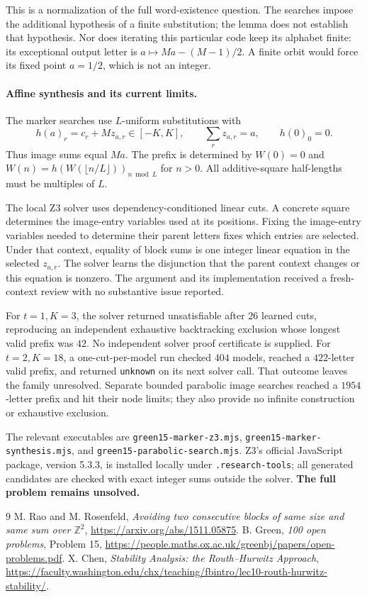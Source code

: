 \documentclass[11pt]{article}
\begin{document}
This is a normalization of the full word-existence question. The searches
impose the additional hypothesis of a finite substitution; the lemma does
not establish that hypothesis. Nor does iterating this particular code keep
its alphabet finite: its exceptional output letter is
$a\mapsto Ma-(M-1)/2$. A finite orbit would force its fixed point $a=1/2$,
which is not an integer.

\paragraph{Affine synthesis and its current limits.}
The marker searches use $L$-uniform substitutions with
\[
 h(a)_r=c_r+Mz_{a,r}\in[-K,K],\qquad
 \sum_r z_{a,r}=a,\qquad h(0)_0=0.
\]
Thus image sums equal $Ma$. The prefix is determined by
$W(0)=0$ and $W(n)=h(W(\lfloor n/L\rfloor))_{n\bmod L}$ for $n>0$.
All additive-square half-lengths must be multiples of $L$.

The local Z3 solver uses dependency-conditioned linear cuts. A concrete
square determines the image-entry variables used at its positions. Fixing
the image-entry variables needed to determine their parent letters fixes
which entries are selected. Under that context, equality of block sums is
one integer linear equation in the selected $z_{a,r}$. The solver learns
the disjunction that the parent context changes or this equation is nonzero.
The argument and its implementation received a fresh-context review with
no substantive issue reported.

For $t=1,K=3$, the solver returned unsatisfiable after $26$ learned cuts,
reproducing an independent exhaustive backtracking exclusion whose longest
valid prefix was $42$. No independent solver proof certificate is supplied.
For $t=2,K=18$, a one-cut-per-model run checked $404$ models, reached a
$422$-letter valid prefix, and returned \texttt{unknown} on its next solver
call. That outcome leaves the family unresolved. Separate bounded parabolic
image searches reached a $1954$-letter prefix and hit their node limits;
they also provide no infinite construction or exhaustive exclusion.

The relevant executables are \texttt{green15-marker-z3.mjs},
\texttt{green15-marker-synthesis.mjs}, and \texttt{green15-parabolic-search.mjs}.
Z3's official JavaScript package, version 5.3.3, is installed locally under
\texttt{.research-tools}; all generated candidates are checked with exact
integer sums outside the solver. \textbf{The full problem remains unsolved.}

\begin{thebibliography}{9}
 M. Rao and M. Rosenfeld,
\emph{Avoiding two consecutive blocks of same size and same sum over
$\mathbb Z^2$}, \url{https://arxiv.org/abs/1511.05875}.
 B. Green, \emph{100 open problems}, Problem 15,
\url{https://people.maths.ox.ac.uk/greenbj/papers/open-problems.pdf}.
 X. Chen, \emph{Stability Analysis: the Routh--Hurwitz Approach},
\url{https://faculty.washington.edu/chx/teaching/fbintro/lec10-routh-hurwitz-stability/}.
\end{thebibliography}
\end{document}
